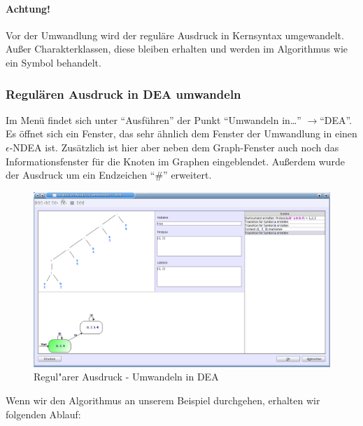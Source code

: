 \paragraph*{Achtung!} Vor der Umwandlung wird der reguläre Ausdruck in Kernsyntax umgewandelt. Außer Charakterklassen, diese bleiben erhalten und werden im Algorithmus wie ein Symbol behandelt.

\subsubsection{Regulären Ausdruck in DEA umwandeln}

Im Menü findet sich unter "`Ausführen"' der Punkt "`Umwandeln in\ldots"' $\rightarrow$"`DEA"'. Es öffnet sich ein Fenster, das sehr ähnlich dem Fenster der Umwandlung in einen $\epsilon$-NDEA ist. Zusätzlich ist hier aber neben dem Graph-Fenster auch noch das Informationsfenster für die Knoten im Graphen eingeblendet. Außerdem wurde der Ausdruck um ein Endzeichen "`\#"' erweitert.

\begin{figure}[h]
\begin{center}
\includegraphics[width=12cm]{../images/regex_to_dfa.png}
\caption{Regul"arer Ausdruck - Umwandeln in DEA}
\end{center}
\end{figure}

Wenn wir den Algorithmus an unserem Beispiel durchgehen, erhalten wir folgenden Ablauf:

